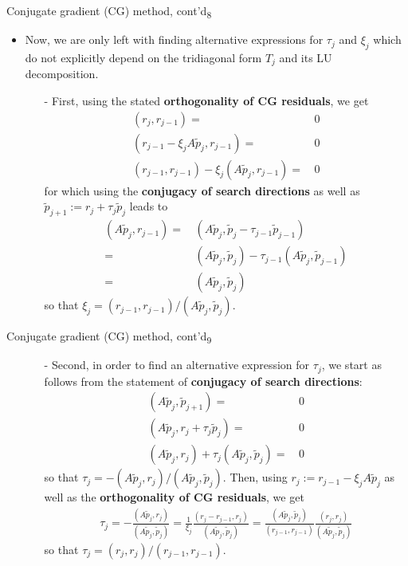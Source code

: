 \documentclass[t,usepdftitle=false]{beamer}
\begin{document}
\begin{frame}{Conjugate gradient (CG) method, cont'd\textsubscript{8}}
\begin{itemize}
\item Now, we are only left with finding alternative expressions for $\tau_j$ and $\xi_j$ which do not explicitly depend on the tridiagonal form $T_j$ and its LU decomposition.
\begin{itemize}\normalsize
\item[-] First, using the stated \textbf{orthogonality of CG residuals}, we get
\begin{align*}
(r_j,r_{j-1})=&\,0\\
(r_{j-1}-\xi_jA\tilde{p}_j,r_{j-1})=&\,0\\
(r_{j-1},r_{j-1})-\xi_j(A\tilde{p}_j,r_{j-1})=&\,0
\end{align*}
for which using the \textbf{conjugacy of search directions} as well as $\tilde{p}_{j+1}:=r_j+\tau_j\tilde{p}_j$ leads to
\begin{align*}
(A\tilde{p}_j,r_{j-1})
=&\,(A\tilde{p}_j,\tilde{p}_j-\tau_{j-1}\tilde{p}_{j-1})\\
=&\,(A\tilde{p}_j,\tilde{p}_j)-\tau_{j-1}(A\tilde{p}_j,\tilde{p}_{j-1})\\
=&\,(A\tilde{p}_j,\tilde{p}_j)
\end{align*}
so that $\boxed{\xi_j=(r_{j-1},r_{j-1})/(A\tilde{p}_j,\tilde{p}_j)}$.
\end{itemize}
\end{itemize}
\end{frame}

\begin{frame}{Conjugate gradient (CG) method, cont'd\textsubscript{9}}
\begin{itemize}
\item[]
\begin{itemize}\normalsize
\item[-] Second, in order to find an alternative expression for $\tau_j$, we start as follows from the statement of \textbf{conjugacy of search directions}:
\begin{align*}
(A\tilde{p}_j,\tilde{p}_{j+1})=&\,0\\
(A\tilde{p}_j,r_j+\tau_j\tilde{p}_{j})=&\,0\\
(A\tilde{p}_j,r_j)+\tau_j(A\tilde{p}_j,\tilde{p}_{j})=&\,0
\end{align*}
so that $\tau_j=-(A\tilde{p}_j,r_j)/(A\tilde{p}_j,\tilde{p}_j)$.
Then, using $r_j:=r_{j-1}-\xi_jA\tilde{p}_j$ as well as the \textbf{orthogonality of CG residuals}, we get
\begin{align*}
\tau_j=
-\frac{(A\tilde{p}_j,r_j)}{(A\tilde{p}_j,\tilde{p}_j)}=
\frac{1}{\xi_j}\frac{(r_j-r_{j-1},r_j)}{(A\tilde{p}_j,\tilde{p}_j)}=
\frac{(A\tilde{p}_j,\tilde{p}_j)}{(r_{j-1},r_{j-1})}\frac{(r_j,r_j)}{(A\tilde{p}_j,\tilde{p}_j)}
\end{align*}
so that $\boxed{\tau_j=(r_j,r_j)/(r_{j-1},r_{j-1})}$.
\end{itemize}
\end{itemize}
\end{frame}
\end{document}
